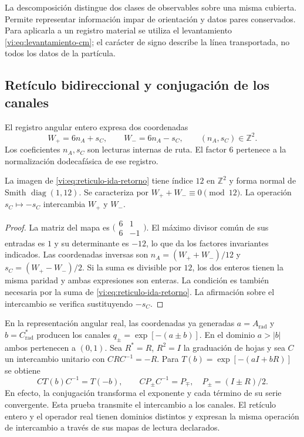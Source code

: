 La descomposición distingue dos clases de observables sobre una
misma cubierta. Permite representar información impar de orientación
y datos pares conservados. Para aplicarla a un registro material se
utiliza el levantamiento \eqref{vi:eq:levantamiento-cm}; el carácter
de signo describe la línea transportada, no todos los datos de la
partícula.

\subsection{Retículo bidireccional y conjugación de los canales}
\label{vi:subsec:reticulo-bidireccional}

El registro angular entero expresa dos coordenadas
\begin{equation}
 W_+=6n_A+s_C,\qquad W_-=6n_A-s_C,
 \qquad (n_A,s_C)\in\mathbb Z^2.
 \label{vi:eq:reticulo-ida-retorno}
\end{equation}
Los coeficientes $n_A,s_C$ son lecturas internas de ruta. El factor
$6$ pertenece a la normalización dodecafásica de ese registro.

\begin{proposition}
\label{vi:prop:indice-bidireccional}
La imagen de \eqref{vi:eq:reticulo-ida-retorno} tiene índice $12$
en $\mathbb Z^2$ y forma normal de Smith $\operatorname{diag}(1,12)$.
Se caracteriza por $W_++W_-\equiv0\pmod{12}$. La operación
$s_C\mapsto-s_C$ intercambia $W_+$ y $W_-$.
\end{proposition}
\begin{proof}
La matriz del mapa es
$\bigl(\begin{smallmatrix}6&1\\6&-1\end{smallmatrix}\bigr)$.
El máximo divisor común de sus entradas es $1$ y su determinante
es $-12$, lo que da los factores invariantes indicados. Las
coordenadas inversas son
$n_A=(W_++W_-)/12$ y $s_C=(W_+-W_-)/2$.
Si la suma es divisible por $12$, los dos enteros tienen la misma
paridad y ambas expresiones son enteras. La condición es también
necesaria por la suma de \eqref{vi:eq:reticulo-ida-retorno}.
La afirmación sobre el intercambio se verifica sustituyendo $-s_C$.
\end{proof}

En la representación angular real, las coordenadas ya generadas
$a=A_{\mathrm{rad}}$ y $b=C^*_{\mathrm{rad}}$ producen los
canales $q_\pm=\exp[-(a\pm b)]$. En el dominio $a>|b|$ ambos
pertenecen a $(0,1)$. Sea $R^*=R$, $R^2=I$ la graduación de
hojas y sea $C$ un intercambio unitario con $CRC^{-1}=-R$.
Para $T(b)=\exp[-(aI+bR)]$ se obtiene
\begin{equation}
 CT(b)C^{-1}=T(-b),\qquad
 CP_\pm C^{-1}=P_\mp,\quad P_\pm=(I\pm R)/2.
 \label{vi:eq:conjugacion-canales}
\end{equation}
En efecto, la conjugación transforma el exponente y cada término
de su serie convergente. Esta prueba transmite el intercambio a
los canales. El retículo entero y el operador real tienen dominios
distintos y expresan la misma operación de intercambio a través de
sus mapas de lectura declarados.

